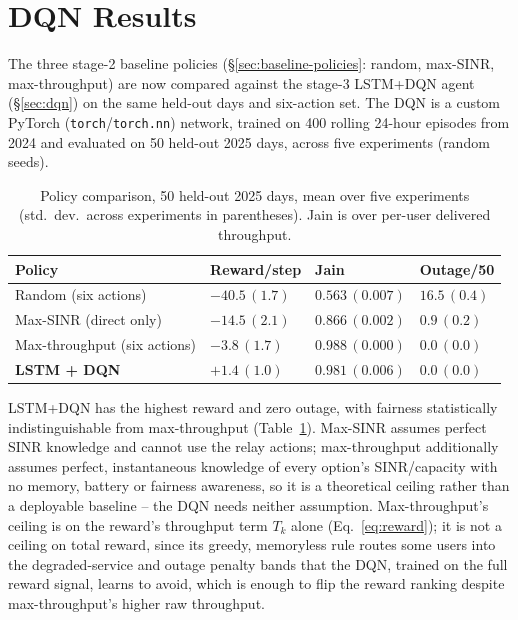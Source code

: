 \documentclass[]{ieeeaccess}
\begin{document}
\section{DQN Results}
\label{sec:dqn-results}

The three stage-2 baseline policies (\S\ref{sec:baseline-policies}: random, max-SINR, max-throughput) are now compared against the stage-3 LSTM+DQN agent (\S\ref{sec:dqn}) on the same held-out days and six-action set. The DQN is a custom PyTorch (\texttt{torch}/\texttt{torch.nn}) network, trained on 400 rolling 24-hour episodes from 2024 and evaluated on 50 held-out 2025 days, across five experiments (random seeds).

\begin{table}[t]
\centering
\caption{Policy comparison, 50 held-out 2025 days, mean over five experiments (std.\ dev.\ across experiments in parentheses). Jain is over per-user delivered throughput.}
\label{tab:dqn-all-policies}
{\scriptsize\setlength{\tabcolsep}{3pt}
\begin{tabularx}{\columnwidth}{|>{\raggedright\arraybackslash}X|>{\centering\arraybackslash}X|>{\centering\arraybackslash}X|>{\centering\arraybackslash}X|}
\hline
\textbf{Policy} & \textbf{Reward/step} & \textbf{Jain} & \textbf{Outage/50} \\
\hline
Random (six actions) & $-40.5\,(1.7)$ & $0.563\,(0.007)$ & $16.5\,(0.4)$ \\
\hline
Max-SINR (direct only) & $-14.5\,(2.1)$ & $0.866\,(0.002)$ & $0.9\,(0.2)$ \\
\hline
Max-throughput (six actions) & $-3.8\,(1.7)$ & $\mathbf{0.988}\,(0.000)$ & $\mathbf{0.0}\,(0.0)$ \\
\hline
\textbf{LSTM + DQN} & $\mathbf{+1.4}\,(1.0)$ & $0.981\,(0.006)$ & $\mathbf{0.0}\,(0.0)$ \\
\hline
\end{tabularx}}
\end{table}

LSTM+DQN has the highest reward and zero outage, with fairness statistically indistinguishable from max-throughput (Table~\ref{tab:dqn-all-policies}). Max-SINR assumes perfect SINR knowledge and cannot use the relay actions; max-throughput additionally assumes perfect, instantaneous knowledge of every option's SINR/capacity with no memory, battery or fairness awareness, so it is a theoretical ceiling rather than a deployable baseline -- the DQN needs neither assumption. Max-throughput's ceiling is on the reward's throughput term $T_k$ alone (Eq.~\eqref{eq:reward}); it is not a ceiling on total reward, since its greedy, memoryless rule routes some users into the degraded-service and outage penalty bands that the DQN, trained on the full reward signal, learns to avoid, which is enough to flip the reward ranking despite max-throughput's higher raw throughput.
\end{document}
